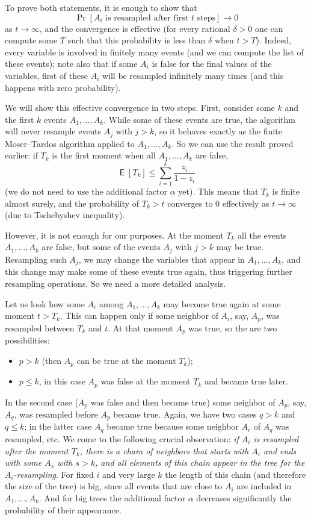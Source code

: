 \documentclass[12pt]{article}
\DeclareMathOperator{\E}{\mathsf{E}}
\begin{document}
To prove both statements, it is enough to show that
$$
\Pr[\text{$A_i$ is resampled after first $t$ steps}]\to 0
$$
as $t\to \infty$, and the convergence is effective (for every rational $\delta>0$ one can compute some $T$ such that this probability is less than $\delta$ when $t>T$). Indeed, every variable is involved in finitely many events (and we can compute the list of these events); note also that if some $A_i$ is false for the final values of the variables, first of these $A_i$ will be resampled infinitely many times (and this happens with zero probability).

We will show this effective convergence in two steps. First, consider some $k$ and the first $k$ events $A_1,\ldots, A_k$. While some of these events are true, the algorithm will never resample events $A_j$ with $j>k$, so it behaves exactly as the finite Moser--Tardos algorithm applied to $A_1,\ldots,A_k$. So we can use the result proved earlier: if $T_k$ is the first moment when all $A_1,\ldots,A_k$ are false,
	$$
\E [T_k] \le \sum_{i=1}^k \frac{z_i}{1-z_i}
	$$
(we do not need to use the additional factor $\alpha$ yet). This means that $T_k$ is finite almost surely, and the probability of $T_k > t$ converges to $0$ effectively as $t\to\infty$ (due to Tschebyshev inequality).

However, it is not enough for our purposes. At the moment $T_k$ all the events $A_1,\ldots,A_k$ are false, but some of the events $A_j$ with $j>k$ may be true. Resampling such $A_j$, we may change the variables that appear in $A_1,\ldots,A_k$, and this change may make some of these events true again, thus triggering further resampling operations. So we need a more detailed analysis.

Let us look how some $A_i$ among $A_1,\ldots,A_k$ may become true again at some moment $t>T_k$. This can happen only if some neighbor of $A_i$, say, $A_p$, was resampled between $T_k$ and $t$. At that moment $A_p$ was true, so the are two possibilities:
\begin{itemize}
\item $p>k$ (then $A_p$ can be true at the moment $T_k$);
\item $p\le k$, in this case $A_p$ was false at the moment $T_k$ and became true later.
\end{itemize}
In the second case ($A_p$ was false and then became true) some neighbor of $A_p$, say, $A_q$, was resampled before $A_p$ became true. Again, we have two cases $q>k$ and $q\le k$; in the latter case $A_q$ became true because some neighbor $A_r$ of $A_q$ was resampled, etc. We come to the following crucial observation: \emph{if $A_i$ is resampled after the moment $T_k$, there is a chain of neighbors that starts with $A_i$ and ends with some $A_s$ with $s>k$, and all elements of this chain appear in the tree for the $A_i$-resampling}. For fixed $i$ and very large $k$ the length of this chain (and therefore the size of the tree) is big, since all events that are close to $A_i$ are included in $A_1,\ldots,A_k$. And for big trees the additional factor $\alpha$ decreases significantly the probability of their appearance.
\end{document}
